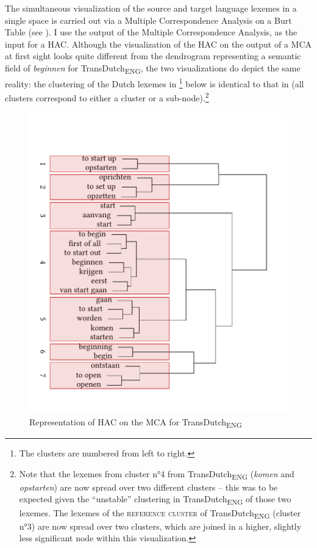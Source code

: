 The simultaneous visualization of the source and target language lexemes in a single space is carried out via a Multiple Correspondence Analysis on a Burt Table \citep{greenacre_simple_2006, greenacre_correspondence_2007} (see ). I use the output of the Multiple Correspondence Analysis, as the input for a HAC. Although the visualization of the HAC on the output of a MCA at first sight looks quite different from the dendrogram representing a semantic field of \textit{beginnen} for TransDutch\textsubscript{ENG}, the two visualizations do depict the same reality: the clustering of the Dutch lexemes in \footnote{The clusters are numbered from left to right.} below is identical to that in  (all clusters correspond to either a cluster or a sub-node).\footnote{Note that the lexemes from cluster n°4 from TransDutch\textsubscript{ENG} (\textit{komen} and \textit{opstarten}) are now spread over two different clusters – this was to be expected given the ``unstable'' clustering in TransDutch\textsubscript{ENG} of those two lexemes. The lexemes of the \textsc{reference cluster} of TransDutch\textsubscript{ENG} (cluster n°3) are now spread over two clusters, which are joined in a higher, slightly less significant node within this visualization.}

\begin{figure}
\includegraphics[width=.75\textwidth,trim=0 20 0 50]{figures/tree92.pdf}
\caption{\label{fig:4:89}Representation of HAC on the MCA for TransDutch\textsubscript{ENG}}
\end{figure}

